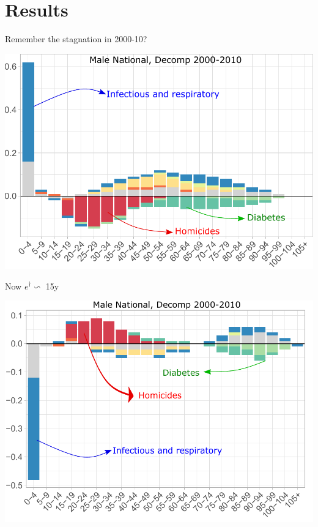 \documentclass[xcolor={dvipsnames}]{beamer}
\begin{document}
\section{Results}

\begin{frame}

\Large{
Remember the stagnation in 2000-10?

				\begin{center}
		\includegraphics[scale=.65]{Figures/Fig_1}
				\end{center}
				

}
\end{frame}


\begin{frame}

\Large{
Now $e^\dagger \backsim$ 15y

				\begin{center}
		\includegraphics[scale=.65]{Figures/Cause_ed_decomp_Males}
				\end{center}				

}
\end{frame}
\end{document}
